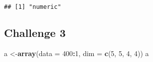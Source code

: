 \documentclass[]{article}
\newenvironment{Shaded}{\begin{snugshade}}{\end{snugshade}}
\newcommand{\DataTypeTok}[1]{\textcolor[rgb]{0.13,0.29,0.53}{#1}}
\newcommand{\DecValTok}[1]{\textcolor[rgb]{0.00,0.00,0.81}{#1}}
\newcommand{\KeywordTok}[1]{\textcolor[rgb]{0.13,0.29,0.53}{\textbf{#1}}}
\newcommand{\NormalTok}[1]{#1}
\newcommand{\OperatorTok}[1]{\textcolor[rgb]{0.81,0.36,0.00}{\textbf{#1}}}
\begin{document}
\begin{verbatim}
## [1] "numeric"
\end{verbatim}

\hypertarget{challenge-3}{%
\subsection{Challenge 3}\label{challenge-3}}

\begin{Shaded}
\begin{Highlighting}[]
\NormalTok{a <-}\KeywordTok{array}\NormalTok{(}\DataTypeTok{data =} \DecValTok{400}\OperatorTok{:}\DecValTok{1}\NormalTok{, }\DataTypeTok{dim =} \KeywordTok{c}\NormalTok{(}\DecValTok{5}\NormalTok{, }\DecValTok{5}\NormalTok{, }\DecValTok{4}\NormalTok{, }\DecValTok{4}\NormalTok{))}
\NormalTok{a}
\end{Highlighting}
\end{Shaded}
\end{document}

